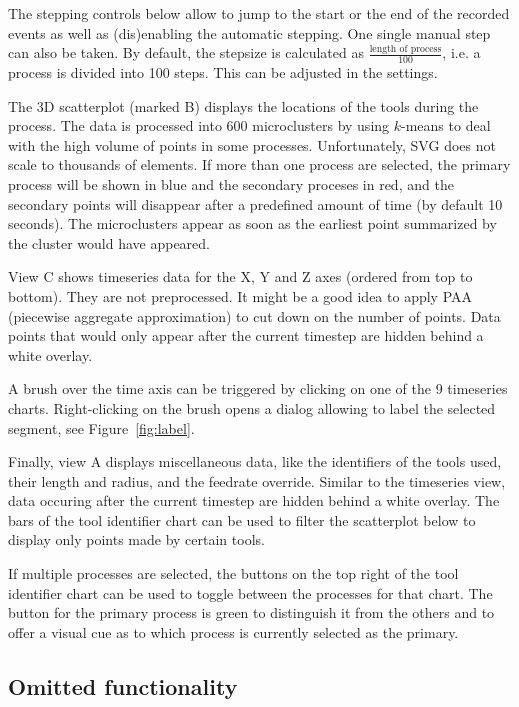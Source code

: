 \documentclass[naustrian]{scrartcl}
\begin{document}
The stepping controls below allow to jump to the start or the end of the
recorded events as well as (dis)enabling the automatic stepping. One single
manual step can also be taken. By default, the stepsize is calculated as
$\frac{\text{length of process}}{100}$, i.e. a process is divided into 100
steps. This can be adjusted in the settings.

The 3D scatterplot (marked B) displays the locations of the tools during the
process. The data is processed into 600 microclusters by using $k$-means to
deal with the high volume of points in some processes. Unfortunately, SVG does
not scale to thousands of elements. If more than one process are selected, the
primary process will be shown in blue and the secondary proceses in red, and
the secondary points will disappear after a predefined amount of time (by
default 10 seconds). The microclusters appear as soon as the earliest point
summarized by the cluster would have appeared.

View C shows timeseries data for the X, Y and Z axes (ordered from top to bottom).
They are not preprocessed. It might be a good idea to apply PAA (piecewise aggregate
approximation) to cut down on the number of points. Data points that would only appear
after the current timestep are hidden behind a white overlay.

A brush over the time axis can be triggered by clicking on one of the 9
timeseries charts. Right-clicking on the brush opens a dialog allowing to label
the selected segment, see Figure~\ref{fig:label}.

Finally, view A displays miscellaneous data, like the identifiers of the tools
used, their length and radius, and the feedrate override. Similar to the
timeseries view, data occuring after the current timestep are hidden behind a
white overlay. The bars of the tool identifier chart can be used to filter the
scatterplot below to display only points made by certain tools.

If multiple processes are selected, the buttons on the top right of the tool
identifier chart can be used to toggle between the processes for that chart.
The button for the primary process is green to distinguish it from the others
and to offer a visual cue as to which process is currently selected as the
primary.

\subsection{Omitted functionality}
\end{document}

